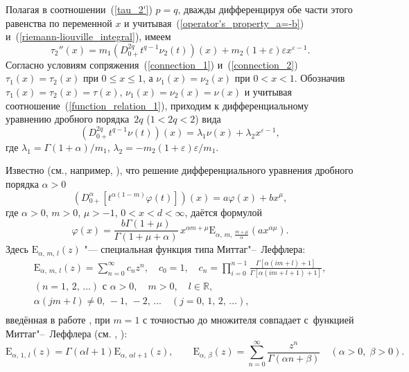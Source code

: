Полагая в соотношении~(\ref{tau_2'}) $p=q$, дважды дифференцируя обе части этого равенства
по переменной $x$ и учитывая~(\ref{operator's_property_a=-b}) и~(\ref{riemann-liouville_integral}),
имеем
\begin{equation*}
 \tau_2''(x)=m_1\left(D_{0+}^{2q}t^{q-1}\nu_2(t)\right)(x)+m_2(1+\varepsilon)\varepsilon x^{\varepsilon-1}.
\end{equation*}
Согласно условиям сопряжения~(\ref{connection_1}) и~(\ref{connection_2})
$\tau_1(x)=\tau_2(x)$ при $0\leqslant x\leqslant1$, а $\nu_1(x)=\nu_2(x)$ при $0<x<1$.
Обозначив $\tau_1(x)=\tau_2(x)=\tau(x)$, $\nu_1(x)=\nu_2(x)=\nu(x)$ и учитывая
соотношение~(\ref{function_relation_1}), приходим к дифференциальному уравнению дробного
порядка~$2q$ ($1<2q<2$) вида
\begin{equation}\label{diff_equ}
 \left(D_{0+}^{2q}t^{q-1}\nu(t)\right)(x)=\lambda_1\nu(x)+\lambda_2x^{\varepsilon-1},
\end{equation}
где
 $\lambda_1={\Gamma(1+\alpha)}/{m_1}$, $\lambda_2=-{m_2(1+\varepsilon)\varepsilon}/{m_1}$.

Известно (см., например, \cite[с.~102]{sayg:KS1}), что решение дифференциального уравнения дробного порядка $\alpha>0$
\begin{equation}\label{diff_equ_frac}
 \left(D_{0+}^{\alpha}[t^{\alpha(1-m)}\varphi(t)]\right)(x)=a\varphi(x)+bx^{\mu},
\end{equation}
где
$ \alpha>0$, $m>0$, $\mu>-1$, $0<x<d<\infty$,
даётся формулой
\begin{equation}\label{solution'}
 \varphi(x)=\frac{b\Gamma(1+\mu)}{\Gamma(1+\mu+\alpha)}\,x^{\alpha m+\mu}\mathrm{E}_{\alpha,\,m,\,\frac{m+\mu}{\alpha}}\left(ax^{\alpha\mu}\right).
\end{equation}
Здесь $\mathrm{E}_{\alpha,\,m,\,l}(z)$ "--- специальная функция типа Миттаг"--~Леффлера:
\begin{equation*}
\begin{array}{c}
  \displaystyle\mathrm{E}_{\alpha,\,m,\,l}(z)=\sum_{n=0}^{\infty}c_nz^n,\quad c_0=1,\quad c_n=\prod_{i=0}^{n-1}\frac{\Gamma[\alpha(im+l)+1]}{\Gamma[\alpha(im+l+1)+1]}, \\
  (n=1,\,2,\,...) \textrm{ с } \alpha>0,\quad m>0,\quad l\in \mathbb{R},\\
  \alpha(jm+l)\neq0,\,-1,\,-2,\,...\quad (j=0,\,1,\,2,\,...), \\
\end{array}
\end{equation*}
введённая в работе \cite{sayg:KS2}, при $m=1$ с точностью до множителя совпадает с~функцией Миттаг"--~Леффлера (см. \cite[с.~33]{sayg:SKM}, \cite[с.~17]{sayg:D}):
\begin{equation*}
  \displaystyle\mathrm{E}_{\alpha,\,1,\,l}(z)=\Gamma(\alpha l+1)\mathrm{E}_{\alpha,\,\alpha l+1}(z), \qquad 
  \displaystyle\mathrm{E}_{\alpha,\,\beta}(z)=\sum_{n=0}^{\infty}\frac{z^n}{\Gamma(\alpha n+\beta)} \quad (\alpha>0,\;\beta>0).
\end{equation*}

